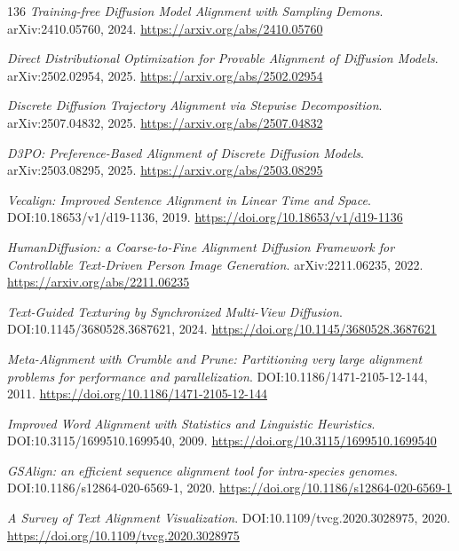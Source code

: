 \documentclass[11pt,a4paper]{article}
\begin{document}
\begin{thebibliography}{136}
\newblock \emph{Training-free Diffusion Model Alignment with Sampling Demons}.
\newblock arXiv:2410.05760, 2024.
\newblock \url{https://arxiv.org/abs/2410.05760}

\newblock \emph{Direct Distributional Optimization for Provable Alignment of Diffusion Models}.
\newblock arXiv:2502.02954, 2025.
\newblock \url{https://arxiv.org/abs/2502.02954}

\newblock \emph{Discrete Diffusion Trajectory Alignment via Stepwise Decomposition}.
\newblock arXiv:2507.04832, 2025.
\newblock \url{https://arxiv.org/abs/2507.04832}

\newblock \emph{D3PO: Preference-Based Alignment of Discrete Diffusion Models}.
\newblock arXiv:2503.08295, 2025.
\newblock \url{https://arxiv.org/abs/2503.08295}

\newblock \emph{Vecalign: Improved Sentence Alignment in Linear Time and Space}.
\newblock DOI:10.18653/v1/d19-1136, 2019.
\newblock \url{https://doi.org/10.18653/v1/d19-1136}

\newblock \emph{HumanDiffusion: a Coarse-to-Fine Alignment Diffusion Framework for Controllable Text-Driven Person Image Generation}.
\newblock arXiv:2211.06235, 2022.
\newblock \url{https://arxiv.org/abs/2211.06235}

\newblock \emph{Text-Guided Texturing by Synchronized Multi-View Diffusion}.
\newblock DOI:10.1145/3680528.3687621, 2024.
\newblock \url{https://doi.org/10.1145/3680528.3687621}

\newblock \emph{Meta-Alignment with Crumble and Prune: Partitioning very large alignment problems for performance and parallelization}.
\newblock DOI:10.1186/1471-2105-12-144, 2011.
\newblock \url{https://doi.org/10.1186/1471-2105-12-144}

\newblock \emph{Improved Word Alignment with Statistics and Linguistic Heuristics}.
\newblock DOI:10.3115/1699510.1699540, 2009.
\newblock \url{https://doi.org/10.3115/1699510.1699540}

\newblock \emph{GSAlign: an efficient sequence alignment tool for intra-species genomes}.
\newblock DOI:10.1186/s12864-020-6569-1, 2020.
\newblock \url{https://doi.org/10.1186/s12864-020-6569-1}

\newblock \emph{A Survey of Text Alignment Visualization}.
\newblock DOI:10.1109/tvcg.2020.3028975, 2020.
\newblock \url{https://doi.org/10.1109/tvcg.2020.3028975}


\end{thebibliography}
\end{document}
